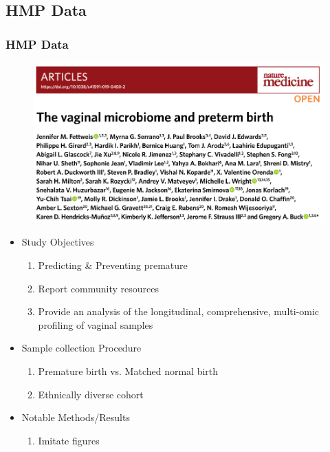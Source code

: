 \documentclass{beamer}
\begin{document}
    \subsection{HMP Data \protect\cite{validate2}}
    \begin{frame}[allowframebreaks]
        \frametitle{HMP Data}

        \begin{figure}
            \includegraphics[width=0.8 \linewidth]{figures/Literature/HMP/title.png}
        \end{figure}
        \newpage

        \begin{itemize}
            \item Study Objectives
            \begin{enumerate}
                \item Predicting \& Preventing premature
                \item Report community resources
                \item Provide an analysis of the longitudinal, comprehensive, multi-omic profiling of vaginal samples
            \end{enumerate}

            \item Sample collection Procedure
            \begin{enumerate}
                \item Premature birth vs. Matched normal birth
                \item Ethnically diverse cohort
            \end{enumerate}

            \item Notable Methods/Results
            \begin{enumerate}
                \item Imitate figures
            \end{enumerate}
        \end{itemize}


\end{frame}
\end{document}
